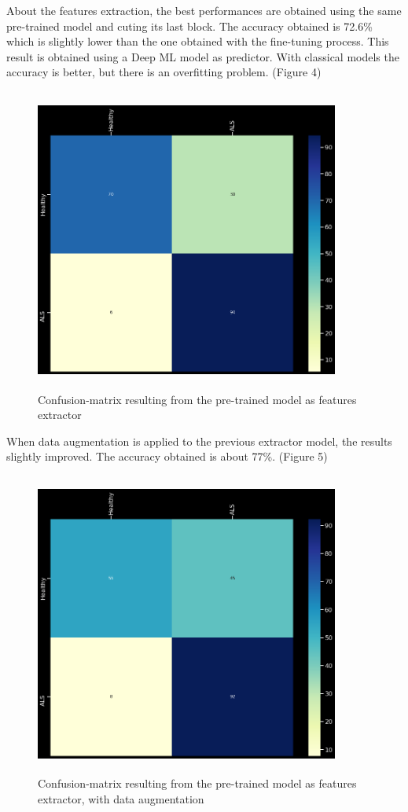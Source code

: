 About the features extraction, the best performances are obtained using the same pre-trained model and cuting its last block. The accuracy obtained is 72.6\% which is slightly lower than the one obtained with the fine-tuning process. This result is obtained using a Deep ML model as predictor. With classical models the accuracy is better, but there is an overfitting problem. (Figure 4)
\begin{figure}[H]
\centering
\caption{Confusion-matrix resulting from the pre-trained model as features extractor}
\includegraphics[width=10cm, height=10cm]{extractor_model_results}
\end{figure}

When data augmentation is applied to the previous extractor model, the results slightly improved. The accuracy obtained is about 77\%. (Figure 5)
\begin{figure}[H]
\centering
\caption{Confusion-matrix resulting from the pre-trained model as features extractor, with data augmentation}
\includegraphics[width=10cm, height=10cm]{extractor_data_augmentation_model_results}
\end{figure}


